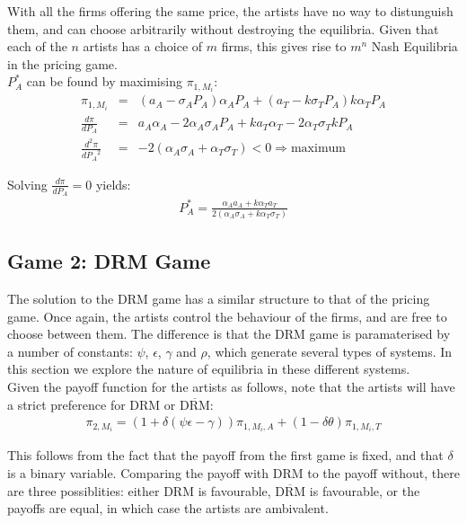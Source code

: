 \documentclass[a4paper,12pt]{article}
\numberwithin{equation}{section}
\newcommand{\drm}{\text{DRM}}
\newcommand{\nodrm}{\overline{\drm}}
\newcommand{\artistpayoff}[2]{\pi_{#1, M_{#2}}}
\newcommand{\artistalbum}[2]{\pi_{#1, M_{#2}, A}}
\newcommand{\artistticket}[2]{\pi_{#1, M_{#2}, T}}
\newcommand{\deriv}[2]{\frac{d #1}{d #2}}
\newcommand{\doublederiv}[2]{\frac{d^2 #1}{d {#2}^2}}
\begin{document}
With all the firms offering the same price, the artists have no way to distunguish them, and can choose arbitrarily without destroying the equilibria. Given that each of the $n$ artists has a choice of $m$ firms, this gives rise to $m^n$ Nash Equilibria in the pricing game.\\

$P_A^*$ can be found by maximising $\artistpayoff{1}{i}$:
\begin{eqnarray*}
\artistpayoff{1}{i} & = & (a_A - \sigma_A P_A)\alpha_A P_A + (a_T - k \sigma_T P_A) k \alpha_T P_A\\
\deriv{\pi}{P_A} & = & a_A \alpha_A - 2 \alpha_A \sigma_A P_A + k a_T \alpha_T - 2 \alpha_T \sigma_T k P_A\\
\doublederiv{\pi}{P_A} & = & -2(\alpha_A \sigma_A + \alpha_T \sigma_T) < 0 \Rightarrow \text{maximum}
\end{eqnarray*}

Solving $\deriv{\pi}{P_A} = 0$ yields:
\begin{eqnarray}
P_A^* = \frac{\alpha_A a_A + k \alpha_T a_T}{2(\alpha_A \sigma_A + k \alpha_T \sigma_T)}
\end{eqnarray}

\subsection{Game 2: DRM Game}

The solution to the DRM game has a similar structure to that of the pricing game. Once again, the artists control the behaviour of the firms, and are free to choose between them. The difference is that the DRM game is paramaterised by a number of constants: $\psi$, $\epsilon$, $\gamma$ and $\rho$, which generate several types of systems. In this section we explore the nature of equilibria in these different systems.\\

Given the payoff function for the artists as follows, note that the artists will have a strict preference for DRM or $\overline{\text{DRM}}$:
\begin{eqnarray*}
\artistpayoff{2}{i} = (1 + \delta (\psi \epsilon - \gamma)) \artistalbum{1}{i} + (1 - \delta \theta) \artistticket{1}{i}
\end{eqnarray*}

This follows from the fact that the payoff from the first game is fixed, and that $\delta$ is a binary variable. Comparing the payoff with DRM to the payoff without, there are three possiblities: either DRM is favourable, $\nodrm$ is favourable, or the payoffs are equal, in which case the artists are ambivalent.\\
\end{document}
